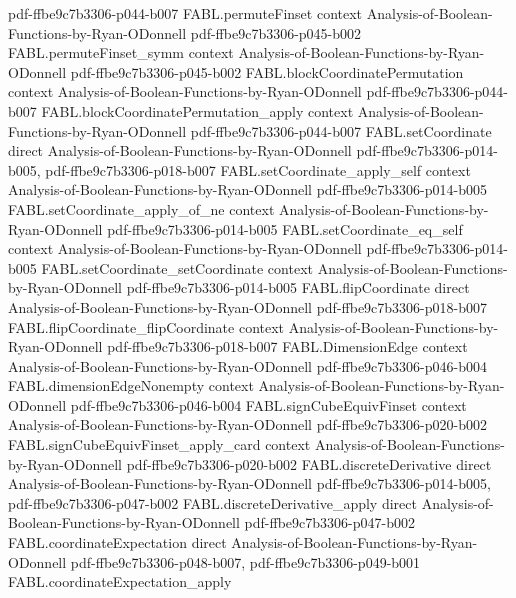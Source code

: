 \begin{theorem}
  {pdf-ffbe9c7b3306-p044-b007}
\proofstep
  {FABL.permuteFinset}
  {context}
  {Analysis-of-Boolean-Functions-by-Ryan-ODonnell}
  {pdf-ffbe9c7b3306-p045-b002}
\proofstep
  {FABL.permuteFinset_symm}
  {context}
  {Analysis-of-Boolean-Functions-by-Ryan-ODonnell}
  {pdf-ffbe9c7b3306-p045-b002}
\proofstep
  {FABL.blockCoordinatePermutation}
  {context}
  {Analysis-of-Boolean-Functions-by-Ryan-ODonnell}
  {pdf-ffbe9c7b3306-p044-b007}
\proofstep
  {FABL.blockCoordinatePermutation_apply}
  {context}
  {Analysis-of-Boolean-Functions-by-Ryan-ODonnell}
  {pdf-ffbe9c7b3306-p044-b007}
\proofstep
  {FABL.setCoordinate}
  {direct}
  {Analysis-of-Boolean-Functions-by-Ryan-ODonnell}
  {pdf-ffbe9c7b3306-p014-b005,
    pdf-ffbe9c7b3306-p018-b007}
\proofstep
  {FABL.setCoordinate_apply_self}
  {context}
  {Analysis-of-Boolean-Functions-by-Ryan-ODonnell}
  {pdf-ffbe9c7b3306-p014-b005}
\proofstep
  {FABL.setCoordinate_apply_of_ne}
  {context}
  {Analysis-of-Boolean-Functions-by-Ryan-ODonnell}
  {pdf-ffbe9c7b3306-p014-b005}
\proofstep
  {FABL.setCoordinate_eq_self}
  {context}
  {Analysis-of-Boolean-Functions-by-Ryan-ODonnell}
  {pdf-ffbe9c7b3306-p014-b005}
\proofstep
  {FABL.setCoordinate_setCoordinate}
  {context}
  {Analysis-of-Boolean-Functions-by-Ryan-ODonnell}
  {pdf-ffbe9c7b3306-p014-b005}
\proofstep
  {FABL.flipCoordinate}
  {direct}
  {Analysis-of-Boolean-Functions-by-Ryan-ODonnell}
  {pdf-ffbe9c7b3306-p018-b007}
\proofstep
  {FABL.flipCoordinate_flipCoordinate}
  {context}
  {Analysis-of-Boolean-Functions-by-Ryan-ODonnell}
  {pdf-ffbe9c7b3306-p018-b007}
\proofstep
  {FABL.DimensionEdge}
  {context}
  {Analysis-of-Boolean-Functions-by-Ryan-ODonnell}
  {pdf-ffbe9c7b3306-p046-b004}
\proofstep
  {FABL.dimensionEdgeNonempty}
  {context}
  {Analysis-of-Boolean-Functions-by-Ryan-ODonnell}
  {pdf-ffbe9c7b3306-p046-b004}
\proofstep
  {FABL.signCubeEquivFinset}
  {context}
  {Analysis-of-Boolean-Functions-by-Ryan-ODonnell}
  {pdf-ffbe9c7b3306-p020-b002}
\proofstep
  {FABL.signCubeEquivFinset_apply_card}
  {context}
  {Analysis-of-Boolean-Functions-by-Ryan-ODonnell}
  {pdf-ffbe9c7b3306-p020-b002}
\proofstep
  {FABL.discreteDerivative}
  {direct}
  {Analysis-of-Boolean-Functions-by-Ryan-ODonnell}
  {pdf-ffbe9c7b3306-p014-b005,
    pdf-ffbe9c7b3306-p047-b002}
\proofstep
  {FABL.discreteDerivative_apply}
  {direct}
  {Analysis-of-Boolean-Functions-by-Ryan-ODonnell}
  {pdf-ffbe9c7b3306-p047-b002}
\proofstep
  {FABL.coordinateExpectation}
  {direct}
  {Analysis-of-Boolean-Functions-by-Ryan-ODonnell}
  {pdf-ffbe9c7b3306-p048-b007,
    pdf-ffbe9c7b3306-p049-b001}
\proofstep
  {FABL.coordinateExpectation_apply}

\end{theorem}
